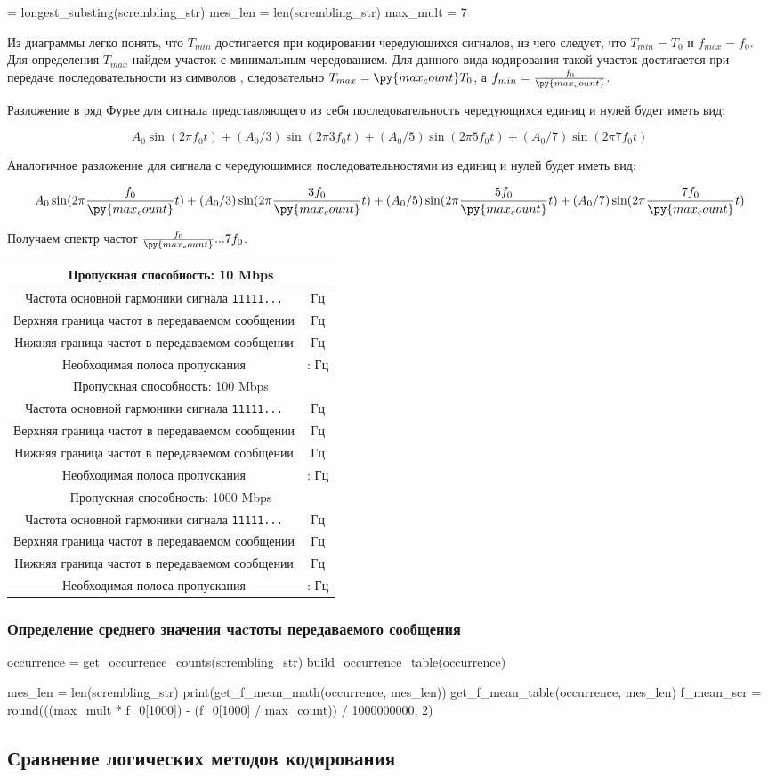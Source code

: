 \documentclass[12pt, a4paper]{article}
\newcommand{\bandwidthEntry}[2]{
  \hline
  \multicolumn{2}{|c|}{Пропускная способность: #1 Mbps} \\
  \hline
  Частота основной гармоники сигнала \texttt{11111...} & \py{int(f_0[#1] * #2)} Гц \\
  Верхняя граница частот в передаваемом сообщении & \py{int(max_mult * f_0[#1])} Гц \\
  Нижняя граница частот в передаваемом сообщении & \py{int(f_0[#1] / max_count)} Гц \\
  Необходимая полоса пропускания & \py{int(f_0[#1] / max_count)} : \py{int(max_mult * f_0[#1])} Гц \\
}
\begin{document}
\begin{pycode}
 = longest_substing(scrembling_str)
mes_len = len(scrembling_str)
max_mult = 7
\end{pycode}

Из диаграммы легко понять, что $T_{min}$ достигается при кодировании чередующихся
сигналов, из чего следует, что $T_{min} = T_0$ и $f_{max} = f_0$. Для определения
$T_{max}$ найдем участок с минимальным чередованием. Для данного вида кодирования
такой участок достигается при передаче последовательности из 
символов \texttt{},
следовательно $T_{max} = \py{max_count} T_0$, а $f_{min} = \frac{f_0}{\py{max_count}}$.

Разложение в ряд Фурье для сигнала представляющего из себя последовательность
чередующихся единиц и нулей будет иметь вид:

$$A_0 \sin(2 \pi f_0 t) + (A_0 / 3) \sin(2 \pi 3 f_0 t) +
  (A_0 / 5) \sin(2 \pi 5 f_0 t) + (A_0 / 7) \sin(2 \pi 7 f_0 t)$$

Аналогичное разложение для сигнала с чередующимися последовательностями из
 единиц и нулей будет иметь вид:

$$A_0 \sin(2 \pi \frac{f_0}{\py{max_count}} t) + (A_0 / 3) \sin(2 \pi \frac{3 f_0}{\py{max_count}} t) +
  (A_0 / 5) \sin(2 \pi \frac{5 f_0}{\py{max_count}} t) + (A_0 / 7) \sin(2 \pi \frac{7 f_0}{\py{max_count}} t)$$

Получаем спектр частот $\frac{f_0}{\py{max_count}}...7 f_0$.

\begin{tabular}{| c | c |}
  \bandwidthEntry{10}{0}
  \bandwidthEntry{100}{0}
  \bandwidthEntry{1000}{0}
  \hline
\end{tabular}

\subsubsection*{Определение среднего значения чаcтоты передаваемого сообщения}

\begin{pycode}
occurrence = get_occurrence_counts(scrembling_str)
build_occurrence_table(occurrence)

mes_len = len(scrembling_str)
print(get_f_mean_math(occurrence, mes_len))
get_f_mean_table(occurrence, mes_len)
f_mean_scr = round(((max_mult * f_0[1000]) - (f_0[1000] / max_count)) / 1000000000, 2)
\end{pycode}

\subsection{Сравнение логических методов кодирования}
\end{document}
